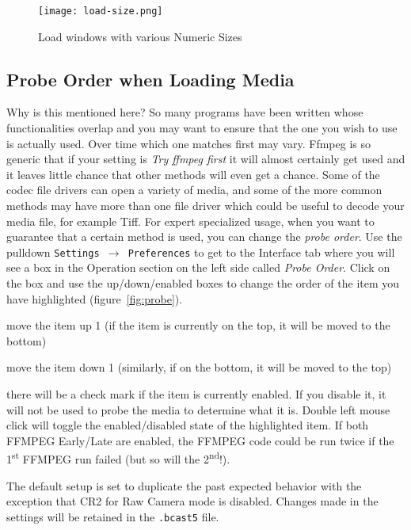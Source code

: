 \begin{figure}[htpb]
    \centering
    \texttt{[image: load-size.png]}
    \caption{Load windows with various Numeric Sizes}
    \label{fig:load-size}
\end{figure}

\subsection{Probe Order when Loading Media}%
\label{sub:probe_order_loading_media}

Why is this mentioned here?  So many programs have been written whose functionalities overlap and you may want to ensure that the one you wish to use is actually used.  Over time which one matches first may vary.  Ffmpeg is so generic that if your setting is \textit{Try ffmpeg first} it will almost certainly get used and it leaves little chance that other methods will even get a chance.  Some of the codec file drivers can open a variety of media, and some of the more common methods may have more than one file driver which could be useful to decode your media file, for example Tiff.  For expert specialized usage, when you want to guarantee that a certain method is used, you can change the \textit{probe order}.  Use the pulldown \texttt{Settings $\rightarrow$ Preferences} to get to the Interface tab where you will see a box in the Operation section on the left side called \textit{Probe Order}.  Click on the box and use the up/down/enabled boxes to change the order of the item you have highlighted (figure~\ref{fig:probe}).

\begin{description} [noitemsep]
    \item[Up] move the item up 1 (if the item is currently on the top, it will be moved to the bottom)
    \item[Down] move the item down 1 (similarly, if on the bottom, it will be moved to the top)
    \item[Enable] there will be a check mark if the item is currently enabled.  If you disable it, it will not be used to probe the media to determine what it is.  Double left mouse click will toggle the enabled/disabled state of the highlighted item.  If both FFMPEG Early/Late are enabled, the FFMPEG code could be run twice if the 1\textsuperscript{st} FFMPEG run failed (but so will the 2\textsuperscript{nd}!).
\end{description}

The default setup is set to duplicate the past expected behavior with the exception that CR2 for Raw Camera mode is disabled.  Changes made in the settings will be retained in the \texttt{.bcast5} file.

